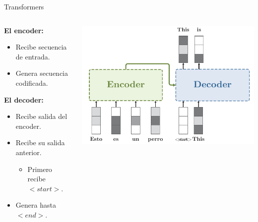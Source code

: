 \documentclass[aspectratio=169]{beamer}
\begin{document}
\begin{frame}{Transformers}
  \begin{columns}
    \begin{column}{.4\textwidth}
      \textbf{El encoder:}
      \begin{itemize}
        \item Recibe secuencia de entrada.
        \item Genera secuencia codificada.
      \end{itemize}
      \vspace{.5cm}
      \textbf{El decoder:}
      \begin{itemize}
        \item Recibe salida del encoder.
        \item Recibe su salida anterior.
        \begin{itemize}
          \item Primero recibe \emph{$<start>$}.
        \end{itemize}
        \item Genera hasta \emph{$<end>$}.
      \end{itemize}
    \end{column}
    \begin{column}{.6\textwidth}
      \includegraphics[width=\textwidth, center]{imgs/tema4/att/Transformer_all_s2.pdf}
    \end{column}
  \end{columns}
\end{frame}
\end{document}
